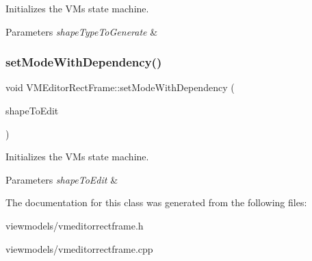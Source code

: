Initializes the VM\textquotesingle{}s state machine. 


\begin{DoxyParams}{Parameters}
{\em shape\+Type\+To\+Generate} & \\
\hline
\end{DoxyParams}
\mbox{\label{class_v_m_editor_rect_frame_abedc584604fbdc11e18898e7e0951dc3}} 
\subsubsection{\texorpdfstring{setModeWithDependency()}{setModeWithDependency()}\hspace{0.1cm}{\footnotesize\ttfamily [2/2]}}
{\footnotesize\ttfamily void V\+M\+Editor\+Rect\+Frame\+::set\+Mode\+With\+Dependency (\begin{DoxyParamCaption}\item[{\mbox{\hyperlink{class_i_shape}{I\+Shape}} $\ast$}]{shape\+To\+Edit }\end{DoxyParamCaption})}



Initializes the VM\textquotesingle{}s state machine. 


\begin{DoxyParams}{Parameters}
{\em shape\+To\+Edit} & \\
\hline
\end{DoxyParams}


The documentation for this class was generated from the following files\+:\begin{DoxyCompactItemize}
\item 
viewmodels/vmeditorrectframe.\+h\item 
viewmodels/vmeditorrectframe.\+cpp\end{DoxyCompactItemize}
